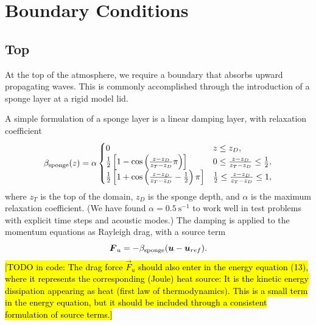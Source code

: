 \documentclass{report}
\begin{document}
\chapter{Boundary Conditions}\label{sct:bc}

\section{Top} 
At the top of the atmosphere, we require a boundary that absorbs upward propagating waves. This is commonly accomplished through the introduction of a sponge layer at a rigid model lid. 

A simple formulation of a sponge layer is a linear damping layer, with relaxation coefficient \citep{durran:1983}
\begin{equation}\label{eq:spongeDurran}
\beta_{\rm sponge}(z) = \alpha
    \begin{cases}
    0 &  z\leq z_D,\\
    \frac{1}{2}\left[1 - \cos\left(\frac{z - z_D}{z_T - z_D}\pi\right) \right] &  0\leq \frac{z - z_D}{z_T - z_D} \leq \frac{1}{2},\\
    \frac{1}{2}\left[1 + \cos\left(\frac{z - z_D}{z_T - z_D} - \frac{1}{2}\right)\pi \right]  &  \frac{1}{2}\leq \frac{z - z_D}{z_T - z_D} \leq 1,\\
    \end{cases}
\end{equation}
where $z_T$ is the top of the domain, $z_D$ is the sponge depth, and $\alpha$ is the maximum relaxation coefficient. (We have found $\alpha = 0.5~\mathrm{s^{-1}}$ to work well in test problems with explicit time steps and acoustic modes.) The damping is applied to the momentum equations as Rayleigh drag, with a source term
\begin{equation*}
\vec{F}_u = -\beta_{\rm sponge} (\vec{u} - \vec{u}_{ref}).
\end{equation*}
\hl{[TODO in code: The drag force $\vec{F}_u$ should also enter in the energy equation (13), where it represents the corresponding (Joule) heat source: It is the kinetic energy dissipation appearing as heat (first law of thermodynamics). This is a small term in the energy equation, but it should be included through a consistent formulation of source terms.]} 
\end{document}
